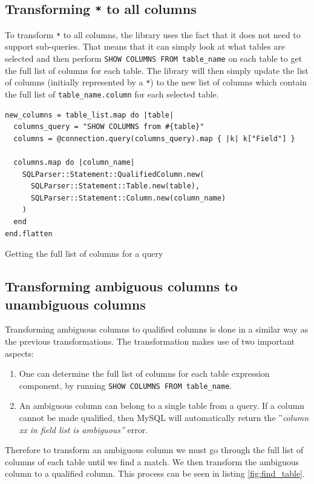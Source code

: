 \subsection{Transforming \texttt{*} to all columns}
To transform \texttt{*} to all columns, the library uses the fact that it does not need to support sub-queries. That means that it can simply look at what tables are selected and then perform \texttt{SHOW COLUMNS FROM table_name} on each table to get the full list of columns for each table. The library will then simply update the list of columns (initially represented by a \texttt{*}) to the new list of columns which contain the full list of \texttt{table\_name.column} for each selected table.

\begin{code}
\begin{verbatim}
new_columns = table_list.map do |table|
  columns_query = "SHOW COLUMNS from #{table}"
  columns = @connection.query(columns_query).map { |k| k["Field"] }

  columns.map do |column_name|
    SQLParser::Statement::QualifiedColumn.new(
      SQLParser::Statement::Table.new(table),
      SQLParser::Statement::Column.new(column_name)
    )
  end
end.flatten
\end{verbatim}
\caption{Getting the full list of columns for a query}
\end{code}

\subsection{Transforming ambiguous columns to unambiguous columns}
Transforming ambiguous columns to qualified columns is done in a similar way as the previous transformations. The transformation makes use of two important aspects:
\begin{enumerate}
    \item One can determine the full list of columns for each table expression component, by running \texttt{SHOW COLUMNS FROM table_name}.
    \item An ambiguous column can belong to a single table from a query. If a column cannot be made qualified, then MySQL will automatically return the ''\textit{column xx in field list is ambiguous''} error.
\end{enumerate}

Therefore to transform an ambiguous column we must go through the full list of columns of each table until we find a match. We then transform the ambiguous column to a qualified column. This process can be seen in listing \ref{fig:find_table}.

